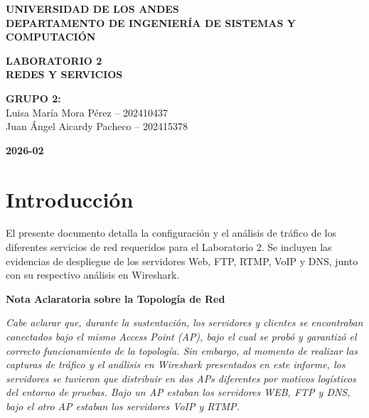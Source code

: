\documentclass[11pt,a4paper]{article}
\begin{document}
\begin{titlepage}

        \begin{center}
        
        \vspace*{0.5cm}
        
        {\Large\textbf{UNIVERSIDAD DE LOS ANDES}}\\[0.2cm]
        {\large\textbf{DEPARTAMENTO DE INGENIERÍA DE SISTEMAS Y COMPUTACIÓN}}
        
        \vfill
        
        {\Large\textbf{LABORATORIO 2}}\\[0.8cm]
        
        {\Large\textbf{REDES Y SERVICIOS}}
        
        \vspace{1.5cm}
        
        {\large\textbf{GRUPO 2:}}\\[0.5cm]
        
        {\large
        Luisa María Mora Pérez -- 202410437\\
        Juan Ángel Aicardy Pacheco -- 202415378
        }
        
        \vfill
        
        {\large\textbf{2026-02}}
        
        \end{center}
    
    \end{titlepage}

\tableofcontents
\newpage

\section{Introducción}
El presente documento detalla la configuración y el análisis de tráfico de los diferentes servicios de red requeridos para el Laboratorio 2. Se incluyen las evidencias de despliegue de los servidores Web, FTP, RTMP, VoIP y DNS, junto con su respectivo análisis en Wireshark.


\begin{center}
\textbf{\large Nota Aclaratoria sobre la Topología de Red}
\end{center}
\textit{Cabe aclarar que, durante la sustentación, los servidores y clientes se encontraban conectados bajo el mismo Access Point (AP), bajo el cual se probó y garantizó el correcto funcionamiento de la topología. Sin embargo, al momento de realizar las capturas de tráfico y el análisis en Wireshark presentados en este informe, los servidores se tuvieron que distribuir en dos APs diferentes por motivos logísticos del entorno de pruebas. Bajo un AP estaban los servidores WEB, FTP y DNS, bajo el otro AP estaban los servidores VoIP y RTMP.}
\end{document}
